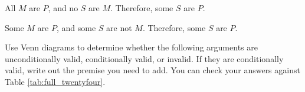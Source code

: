 \begin{exercises}
\item All $M$ are $P$, and no $S$ are $M$. Therefore, some $S$ are $P$.
\item Some $M$ are $P$, and some $S$ are not $M$. Therefore, some $S$ are $P$.
\end{exercises}

\noindent \problempart Use Venn diagrams to determine whether the following arguments are unconditionally valid, conditionally valid, or invalid. If they are conditionally valid, write out the premise you need to add. You can check your answers against Table \ref{tab:full_twentyfour}.

